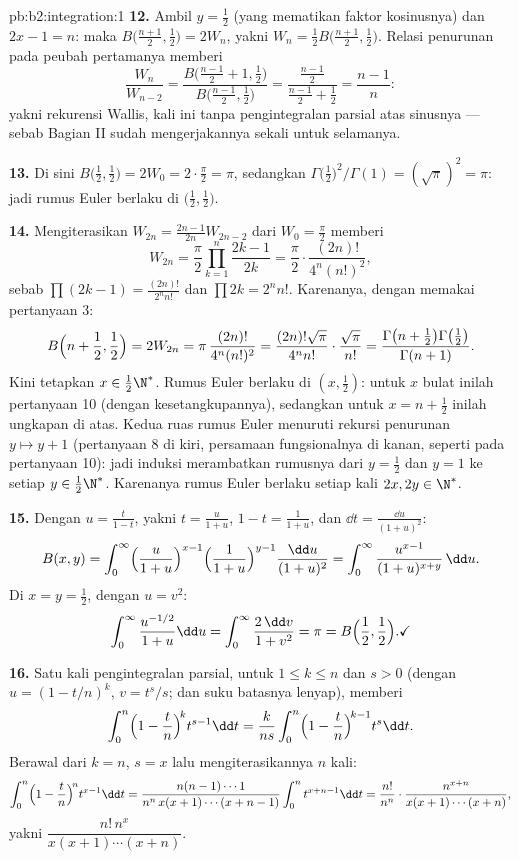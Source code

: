 \begin{solution}{pb:b2:integration:1}
\textbf{12.} Ambil $y = \frac12$ (yang mematikan faktor kosinusnya) dan
$2x - 1 = n$: maka $B\bigl(\frac{n+1}2, \frac12\bigr) = 2W_n$, yakni
$W_n = \frac12 B\bigl(\frac{n+1}2,\frac12\bigr)$. Relasi penurunan pada
peubah pertamanya memberi
\[
\frac{W_n}{W_{n-2}}
= \frac{B\bigl(\frac{n-1}2 + 1, \frac12\bigr)}
{B\bigl(\frac{n-1}2, \frac12\bigr)}
= \frac{\frac{n-1}2}{\frac{n-1}2 + \frac12}
= \frac{n-1}{n} :
\]
yakni rekurensi Wallis, kali ini tanpa pengintegralan parsial atas
sinusnya --- sebab Bagian II sudah mengerjakannya sekali untuk selamanya.

\textbf{13.} Di sini $B\bigl(\frac12,\frac12\bigr) = 2W_0 =
2\cdot\frac\pi2 = \pi$, sedangkan
$\Gamma\bigl(\frac12\bigr)^2/\Gamma(1) = (\sqrt\pi)^2 = \pi$: jadi
rumus Euler berlaku di $\bigl(\frac12,\frac12\bigr)$.

\textbf{14.} Mengiterasikan $W_{2n} = \frac{2n-1}{2n}W_{2n-2}$ dari
$W_0 = \frac\pi2$ memberi
\[
W_{2n} = \frac\pi2\prod_{k=1}^{n}\frac{2k-1}{2k}
= \frac\pi2\cdot\frac{(2n)!}{4^n(n!)^2},
\]
sebab $\prod(2k-1) = \frac{(2n)!}{2^n n!}$ dan $\prod 2k = 2^n
n!$. Karenanya, dengan memakai pertanyaan 3:
\[
B\Bigl(n+\frac12, \frac12\Bigr) = 2W_{2n}
= \pi\,\frac{(2n)!}{4^n(n!)^2}
= \frac{(2n)!\sqrt\pi}{4^n n!}\cdot\frac{\sqrt\pi}{n!}
= \frac{\Gamma\bigl(n+\frac12\bigr)\Gamma\bigl(\frac12\bigr)}
{\Gamma(n+1)} .
\]
Kini tetapkan $x \in \frac12\N^*$. Rumus Euler berlaku di $(x,
\frac12)$: untuk $x$ bulat inilah pertanyaan 10 (dengan kesetangkupannya),
sedangkan untuk $x = n + \frac12$ inilah ungkapan di atas. Kedua ruas
rumus Euler menuruti rekursi penurunan $y \mapsto y + 1$
(pertanyaan 8 di kiri, persamaan fungsionalnya di kanan,
seperti pada pertanyaan 10): jadi induksi merambatkan rumusnya dari $y =
\frac12$ dan $y = 1$ ke setiap $y \in \frac12\N^*$. Karenanya rumus
Euler berlaku setiap kali $2x, 2y \in \N^*$.

\textbf{15.} Dengan $u = \frac{t}{1-t}$, yakni $t =
\frac{u}{1+u}$, $1 - t = \frac{1}{1+u}$, dan $\dd t =
\frac{\dd u}{(1+u)^2}$:
\[
B(x,y) = \int_0^\infty
\Bigl(\frac{u}{1+u}\Bigr)^{x-1}
\Bigl(\frac{1}{1+u}\Bigr)^{y-1}
\frac{\dd u}{(1+u)^2}
= \int_0^\infty \frac{u^{x-1}}{(1+u)^{x+y}}\,\dd u .
\]
Di $x = y = \frac12$, dengan $u = v^2$:
\[
\int_0^\infty \frac{u^{-1/2}}{1+u}\dd u
= \int_0^\infty \frac{2\,\dd v}{1+v^2} = \pi
= B\Bigl(\frac12,\frac12\Bigr) . \checkmark
\]

\textbf{16.} Satu kali pengintegralan parsial, untuk $1 \leq k \leq n$
dan $s > 0$ (dengan $u = (1 - t/n)^k$, $v = t^s/s$; dan suku batasnya
lenyap), memberi
\[
\int_0^n \Bigl(1-\frac tn\Bigr)^{\!k} t^{s-1}\dd t
= \frac{k}{ns}\int_0^n \Bigl(1-\frac tn\Bigr)^{\!k-1}
t^{s}\dd t .
\]
Berawal dari $k = n$, $s = x$ lalu mengiterasikannya $n$ kali:
\[
\int_0^n \Bigl(1-\frac tn\Bigr)^{\!n} t^{x-1}\dd t
= \frac{n(n-1)\cdots1}{n^n\,x(x+1)\cdots(x+n-1)}
\int_0^n t^{x+n-1}\dd t
= \frac{n!}{n^n}\cdot
\frac{n^{x+n}}{x(x+1)\cdots(x+n)} ,
\]
yakni $\dfrac{n!\,n^x}{x(x+1)\cdots(x+n)}$.


\end{solution}
